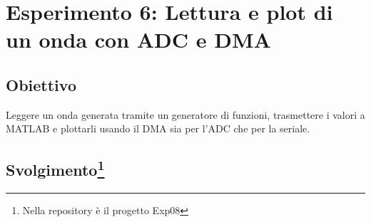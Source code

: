 \chapter*{Esperimento 6: Lettura e plot di un onda con ADC e DMA}

\section*{Obiettivo}
Leggere un onda generata tramite un generatore di funzioni, trasmettere i valori a MATLAB e plottarli usando il DMA sia per l'ADC che per la seriale.

\section*{Svolgimento\footnote{Nella repository è il progetto Exp08}}

